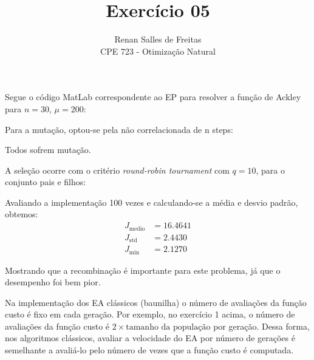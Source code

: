 \documentclass[12pt]{article}
\newenvironment{exercise}[2][Exercício]{\begin{trivlist}
\item[\hskip \labelsep {\bfseries #1}\hskip \labelsep {\bfseries #2.}]}{\end{trivlist}}
\begin{document}
 
 
\title{Exercício 05}
\author{Renan Salles de Freitas\\
CPE 723 - Otimização Natural}
 
\maketitle


\begin{exercise}{1}
Segue o código MatLab correspondente ao EP para resolver a
função de Ackley para $n=30$, $\mu = 200$:


Para a mutação, optou-se pela não correlacionada de n steps:

Todos sofrem mutação.

A seleção ocorre com o critério \textit{round-robin tournament} com $q=10$, para
o conjunto pais e filhos:


Avaliando a implementação 100 vezes e calculando-se a média e desvio padrão,
obtemos:
\begin{align*}
J_{\text{medio}} &= 16.4641 \\
J_{\text{std}} &= 2.4430 \\
J_{\text{min}} &= 2.1270
\end{align*}

Mostrando que a recombinação é importante para este problema, já que o
desempenho foi bem pior.
\end{exercise}

\begin{exercise}{2}
Na implementação dos EA clássicos (baunilha) o número de avaliações da função
custo é fixo em cada geração. Por exemplo, no exercício 1 acima, o número de
avaliações da função custo é $2 \times \text{tamanho da população}$ por geração.
Dessa forma, nos algoritmos clássicos, avaliar a velocidade do EA por número de
gerações é semelhante a avaliá-lo pelo número de vezes que a função custo é
computada.
\end{exercise}
\end{document}
